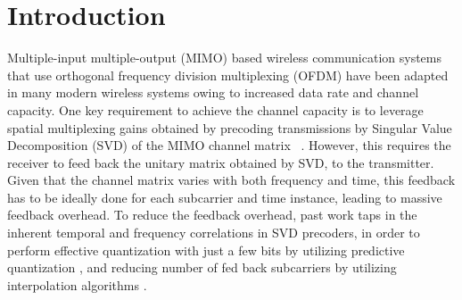 \documentclass[journal,10pt,twocolumn]{IEEEtran}
\begin{document}
\section{Introduction}
\label{intro}


Multiple-input multiple-output (MIMO) based wireless communication
systems that use orthogonal frequency division multiplexing (OFDM)
have been adapted in many modern wireless systems owing to increased
data rate and channel capacity. One key requirement to achieve the channel capacity is to leverage spatial multiplexing gains obtained by precoding transmissions by Singular Value Decomposition (SVD) of the MIMO channel matrix ~\cite{love2008overview}.
However, this requires the receiver to feed back the unitary matrix obtained by SVD, to the transmitter.
Given that the channel matrix varies with both frequency and time, this feedback has to be ideally done for each subcarrier and time instance, leading to massive feedback overhead. To reduce the feedback overhead, past work taps in the inherent temporal and frequency correlations in SVD precoders, in order to perform effective quantization with just a few bits by utilizing predictive quantization \cite{Gupt1905:Predictive,6891198,7370793,sacristan2010differential,5946308,6545375,4114278,4556174}, and reducing number of fed back subcarriers by utilizing interpolation algorithms \cite{Gupt1905:Predictive,5671092,khaled2005quantized}.
\end{document}
